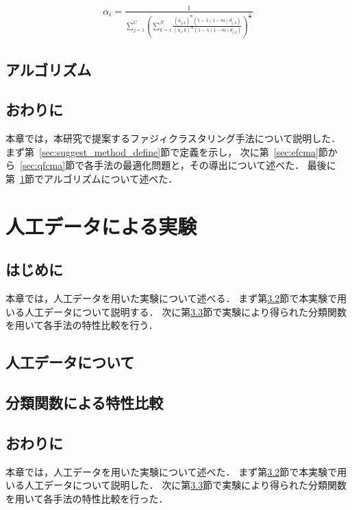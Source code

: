 \documentclass[a4j,12pt,dvipdfmx,oneside]{jsbook}
\theoremstyle{definition}
\begin{document}
\begin{align}
 \alpha_{i}=\frac{1}{\sum_{j=1}^C\left(\sum_{k=1}^N\frac{(u_{j,k})^m(1-\lambda(1-m)d_{j,k})}{(u_i,k)^m(1-\lambda(1-m)d_{i,k})}\right)^{\frac{1}{m}}}
\end{align}
   
\section{アルゴリズム}\label{sec:suggest_algorythm}
%
\section{おわりに}\label{sec:suggest_method_summary}
本章では，本研究で提案するファジィクラスタリング手法について説明した．
まず第~\ref{sec:suggest_method_define}節で定義を示し，
次に第~\ref{sec:efcma}節から~\ref{sec:qfcma}節で各手法の最適化問題と，その導出について述べた．
最後に第~\ref{sec:suggest_algorythm}節でアルゴリズムについて述べた．
%
%
%
\chapter{人工データによる実験}\label{chap:artificial_data}
%
\section{はじめに}\label{sec:artificial_data_intro}
本章では，人工データを用いた実験について述べる．
まず第\ref{sec:about_artificial_data}節で本実験で用いる人工データについて説明する．
次に第\ref{sec:classification_function}節で実験により得られた分類関数を用いて各手法の特性比較を行う．
%
\section{人工データについて}\label{sec:about_artificial_data}
%
\section{分類関数による特性比較}\label{sec:classification_function}
%
\section{おわりに}\label{sec:artificial_data_summary}
本章では，人工データを用いた実験について述べた．
まず第\ref{sec:about_artificial_data}節で本実験で用いる人工データについて説明した．
次に第\ref{sec:classification_function}節で実験により得られた分類関数を用いて各手法の特性比較を行った．
%
%
%
\end{document}
